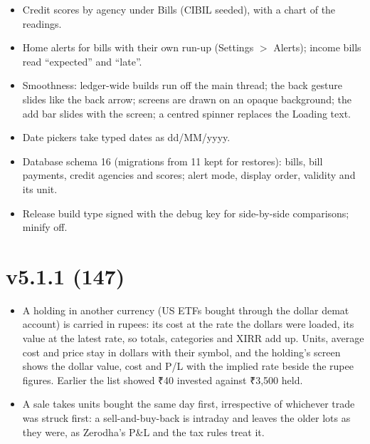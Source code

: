 \documentclass{article}
\begin{document}
\begin{itemize}
        \item Credit scores by agency under Bills (CIBIL seeded), with a chart of the readings.
        \item Home alerts for bills with their own run-up (Settings $>$ Alerts); income bills read ``expected'' and ``late''.
        \item Smoothness: ledger-wide builds run off the main thread; the back gesture slides like the back arrow; screens are drawn on an opaque background; the add bar slides with the screen; a centred spinner replaces the Loading text.
        \item Date pickers take typed dates as dd/MM/yyyy.
        \item Database schema 16 (migrations from 11 kept for restores): bills, bill payments, credit agencies and scores; alert mode, display order, validity and its unit.
        \item Release build type signed with the debug key for side-by-side comparisons; minify off.
    \end{itemize}


    \section{v5.1.1 (147)}\label{sec:147}
    \begin{itemize}
        \item A holding in another currency (US ETFs bought through the dollar demat account) is carried in rupees: its cost at the rate the dollars were loaded, its value at the latest rate, so totals, categories and XIRR add up. Units, average cost and price stay in dollars with their symbol, and the holding's screen shows the dollar value, cost and P/L with the implied rate beside the rupee figures. Earlier the list showed ₹40 invested against ₹3,500 held.
        \item A sale takes units bought the same day first, irrespective of whichever trade was struck first: a sell-and-buy-back is intraday and leaves the older lots as they were, as Zerodha's P\&L and the tax rules treat it.
    \end{itemize}
\end{document}
